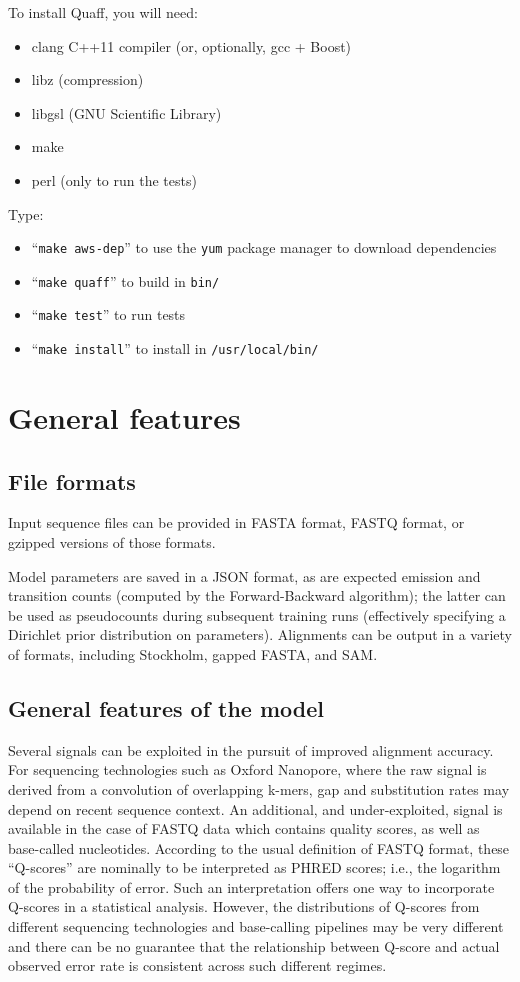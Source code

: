 \documentclass{article}
\begin{document}
To install Quaff, you will need:
\begin{itemize}
\item clang C++11 compiler (or, optionally, gcc + Boost)
\item libz (compression)
\item libgsl (GNU Scientific Library)
\item make
\item perl (only to run the tests)
\end{itemize}

Type:
\begin{itemize}
\item ``{\tt make aws-dep}'' to use the {\tt yum} package manager to download dependencies
\item ``{\tt make quaff}'' to build in {\tt bin/}
\item ``{\tt make test}'' to run tests
\item ``{\tt make install}'' to install in {\tt /usr/local/bin/}
\end{itemize}


\section{General features}

\subsection{File formats}

Input sequence files can be provided in FASTA format, FASTQ format, or gzipped versions of those formats.

Model parameters are saved in a JSON format, as are expected emission and transition counts (computed by the Forward-Backward algorithm); the latter can be used as pseudocounts during subsequent training runs (effectively specifying a Dirichlet prior distribution on parameters). Alignments can be output in a variety of formats, including Stockholm, gapped FASTA, and SAM.


\subsection{General features of the model}

Several signals can be exploited in the pursuit of improved alignment accuracy. For sequencing technologies such as Oxford Nanopore, where the raw signal is derived from a convolution of overlapping k-mers, gap and substitution rates may depend on recent sequence context.
An additional, and under-exploited, signal is available in the case of FASTQ data which contains quality scores, as well as base-called nucleotides. According to the usual definition of FASTQ format, these ``Q-scores'' are nominally to be interpreted as PHRED scores; i.e., the logarithm of the probability of error. Such an interpretation offers one way to incorporate Q-scores in a statistical analysis.  However, the distributions of Q-scores from different sequencing technologies and base-calling pipelines may be very different and there can be no guarantee that the relationship between Q-score and actual observed error rate is consistent across such different regimes.
\end{document}
